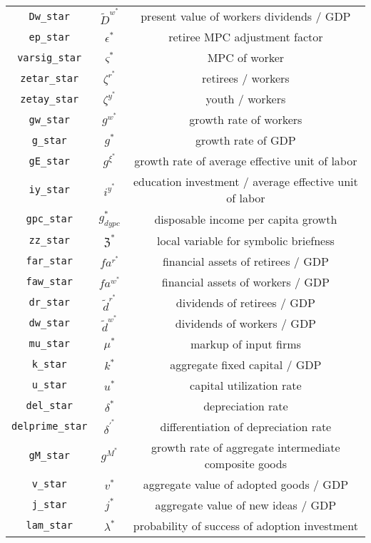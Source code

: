 \begin{center}
\begin{longtable}{ccc}
\texttt{Dw\_star} & $\tilde{D}^w^*$ & present value of workers dividends / GDP\\
\texttt{ep\_star} & ${\epsilon^*}$ & retiree MPC adjustment factor\\
\texttt{varsig\_star} & ${\varsigma^*}$ & MPC of worker\\
\texttt{zetar\_star} & ${\zeta^r^*}$ & retirees / workers\\
\texttt{zetay\_star} & ${\zeta^y^*}$ & youth / workers\\
\texttt{gw\_star} & ${g^w^*}$ & growth rate of workers\\
\texttt{g\_star} & ${g^*}$ & growth rate of GDP\\
\texttt{gE\_star} & ${g^{\xi}^*}$ & growth rate of average effective unit of labor\\
\texttt{iy\_star} & ${i^y^*}$ & education investment / average effective unit of labor\\
\texttt{gpc\_star} & ${g_{dypc}^*}$ & disposable income per capita growth\\
\texttt{zz\_star} & ${\mathfrak{Z}^*}$ & local variable for symbolic briefness\\
\texttt{far\_star} & ${fa^r^*}$ & financial assets of retirees / GDP\\
\texttt{faw\_star} & ${fa^w^*}$ & financial assets of workers / GDP\\
\texttt{dr\_star} & $\tilde{d}^r^*$ & dividends of retirees / GDP\\
\texttt{dw\_star} & $\tilde{d}^w^*$ & dividends of workers / GDP\\
\texttt{mu\_star} & ${\mu^*}$ & markup of input firms\\
\texttt{k\_star} & ${k^*}$ & aggregate fixed capital / GDP\\
\texttt{u\_star} & ${u^*}$ & capital utilization rate\\
\texttt{del\_star} & ${\delta^*}$ & depreciation rate\\
\texttt{delprime\_star} & ${\delta^\prime^*}$ & differentiation of depreciation rate\\
\texttt{gM\_star} & ${g^M^*}$ & growth rate of aggregate intermediate composite goods\\
\texttt{v\_star} & ${v^*}$ & aggregate value of adopted goods / GDP\\
\texttt{j\_star} & ${j^*}$ & aggregate value of new ideas / GDP\\
\texttt{lam\_star} & ${\lambda^*}$ & probability of success of adoption investment\\

\end{longtable}
\end{center}
